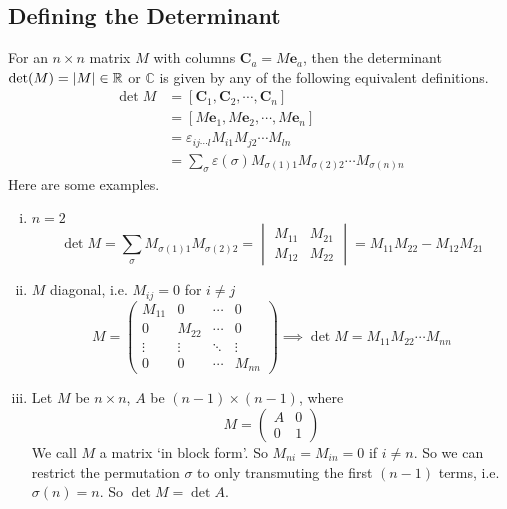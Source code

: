 \documentclass{article}
\begin{document}
	\subsection{Defining the Determinant}
	For an $n \times n$ matrix $M$ with columns $\bm C_a = M\bm e_a$, then the determinant $\det(M) = \abs{M} \in \mathbb R$ or $\mathbb C$ is given by any of the following equivalent definitions.
	\begin{align*}
		\det M
		&= [\bm C_1, \bm C_2, \cdots, \bm C_n] \\
		&= [M\bm e_1, M\bm e_2, \cdots, M\bm e_n] \\
		&= \varepsilon_{ij\cdots l}M_{i1}M_{j2} \cdots M_{ln} \\
		&= \sum_\sigma \varepsilon(\sigma) M_{\sigma(1)1}M_{\sigma(2)2} \cdots M_{\sigma(n)n}
	\end{align*}
	Here are some examples.
	\begin{enumerate}[(i)]
		\item $n=2$
		\[ \det M = \sum_\sigma M_{\sigma(1)1}M_{\sigma(2)2} = \begin{vmatrix}
			M_{11} & M_{21} \\ M_{12} & M_{22}
		\end{vmatrix} = M_{11}M_{22} - M_{12}M_{21} \]
		\item $M$ diagonal, i.e. $M_{ij} = 0$ for $i \neq j$
		\[ M = \begin{pmatrix}
			M_{11} & 0 & \cdots & 0 \\
			0 & M_{22} & \cdots & 0 \\
			\vdots & \vdots & \ddots & \vdots \\
			0 & 0 & \cdots & M_{nn}
		\end{pmatrix} \implies \det M = M_{11}M_{22}\cdots M_{nn} \]
		\item Let $M$ be $n\times n$, $A$ be $(n-1) \times (n-1)$, where
		\[ M = \left( \begin{array}{c|c}
			A & 0 \\\hline
			0 & 1
		\end{array} \right) \]
		We call $M$ a matrix `in block form'. So $M_{ni} = M_{in} = 0$ if $i \neq n$. So we can restrict the permutation $\sigma$ to only transmuting the first $(n-1)$ terms, i.e. $\sigma(n) = n$. So $\det M = \det A$.
	\end{enumerate}
\end{document}
